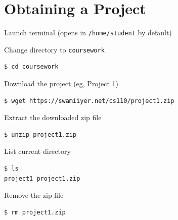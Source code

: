 \documentclass[8pt,a4paper,compress]{beamer}
\begin{document}
\section{Obtaining a Project}
\begin{frame}[fragile]
\pause

Launch terminal (opens in \lstinline{/home/student} by default)

\pause\bigskip

Change directory to \lstinline{coursework}

\begin{tcolorbox}[enhanced,drop shadow southwest,sharp corners,size=fbox,colback=black]
\begin{lstlisting}[style=terminal]
$ cd coursework
\end{lstlisting}
\end{tcolorbox}

\pause\bigskip

Download the project (eg, Project 1)

\begin{tcolorbox}[enhanced,drop shadow southwest,sharp corners,size=fbox,colback=black]
\begin{lstlisting}[style=terminal]
$ wget https://swamiiyer.net/cs110/project1.zip
\end{lstlisting}
\end{tcolorbox}

\pause\bigskip

Extract the downloaded zip file

\begin{tcolorbox}[enhanced,drop shadow southwest,sharp corners,size=fbox,colback=black]
\begin{lstlisting}[style=terminal]
$ unzip project1.zip
\end{lstlisting}
\end{tcolorbox}

\pause\bigskip

List current directory

\begin{tcolorbox}[enhanced,drop shadow southwest,sharp corners,size=fbox,colback=black]
\begin{lstlisting}[style=terminal]
$ ls
project1 project1.zip
\end{lstlisting}
\end{tcolorbox}

\pause\bigskip

Remove the zip file

\begin{tcolorbox}[enhanced,drop shadow southwest,sharp corners,size=fbox,colback=black]
\begin{lstlisting}[style=terminal]
$ rm project1.zip
\end{lstlisting}
\end{tcolorbox}
\end{frame}
\end{document}
